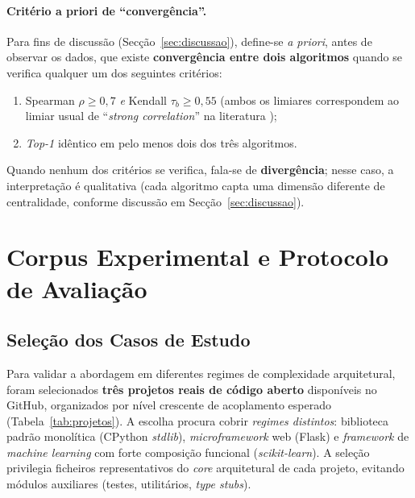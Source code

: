 \paragraph{Critério a priori de ``convergência''.} Para fins de
discussão (Secção~\ref{sec:discussao}), define-se \emph{a priori},
antes de observar os dados, que existe \textbf{convergência entre dois
algoritmos} quando se verifica qualquer um dos seguintes critérios:

\begin{enumerate}[label=(\alph*)]
    \item Spearman $\rho \geq 0{,}7$ \emph{e} Kendall $\tau_b \geq 0{,}55$
        (ambos os limiares correspondem ao limiar usual de
        ``\emph{strong correlation}'' na literatura \parencite{wohlin2012});
    \item \emph{Top-1} idêntico em pelo menos dois dos três
        algoritmos.
\end{enumerate}

Quando nenhum dos critérios se verifica, fala-se de
\textbf{divergência}; nesse caso, a interpretação é qualitativa (cada
algoritmo capta uma dimensão diferente de centralidade, conforme
discussão em Secção~\ref{sec:discussao}).

\section{Corpus Experimental e Protocolo de Avaliação}
\label{sec:protocolo}

\subsection{Seleção dos Casos de Estudo}
\label{sec:selecao}

Para validar a abordagem em diferentes regimes de complexidade
arquitetural, foram selecionados \textbf{três projetos reais de
código aberto} disponíveis no GitHub, organizados por nível
crescente de acoplamento esperado
(Tabela~\ref{tab:projetos}). A escolha procura cobrir
\emph{regimes distintos}: biblioteca padrão monolítica
(CPython \emph{stdlib}), \emph{microframework} web (Flask) e
\emph{framework} de \emph{machine learning} com forte composição
funcional (\emph{scikit-learn}). A seleção privilegia ficheiros
representativos do \emph{core} arquitetural de cada projeto,
evitando módulos auxiliares (testes, utilitários, \emph{type stubs}).

